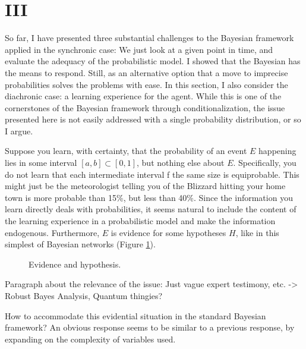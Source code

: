 \documentclass[11pt, a4paper]{scrartcl}
\begin{document}
\section{III}

So far, I have presented three substantial challenges to the Bayesian framework applied in the synchronic case: We just look at a given point in time, and evaluate the adequacy of the probabilistic model. I showed that the Bayesian has the means to respond. Still, as an alternative option that a move to imprecise probabilities solves the problems with ease. In this section, I also consider the diachronic case: a learning experience for the agent. While this is one of the cornerstones of the Bayesian framework through conditionalization, the issue presented here is not easily addressed with a single probability distribution, or so I argue. 

Suppose you learn, with certainty, that the probability of an event $E$ happening lies in some interval $[a,b] \subset [0,1]$, but nothing else about $E$. Specifically, you do not learn that each intermediate interval f the same size is equiprobable. This might just be the meteorologist telling you of the Blizzard hitting your home town is more probable than 15\%, but less than 40\%. Since the information you learn directly deals with probabilities, it seems natural to include the content of the learning experience in a probabilistic model and make the information endogenous. Furthermore, $E$ is evidence for some hypotheses $H$, like in this simplest of Bayesian networks (Figure \ref{fig:net}). 

\begin{figure}[h]
\centering
{}
\caption{Evidence and hypothesis.}
\label{fig:net}
\end{figure}

Paragraph about the relevance of the issue: Just vague expert testimony, etc. -> Robust Bayes Analysis, Quantum thingies? 

How to accommodate this evidential situation in the standard Bayesian framework? An obvious response seems to be similar to a previous response, by expanding on the complexity of variables used.   
\end{document}
